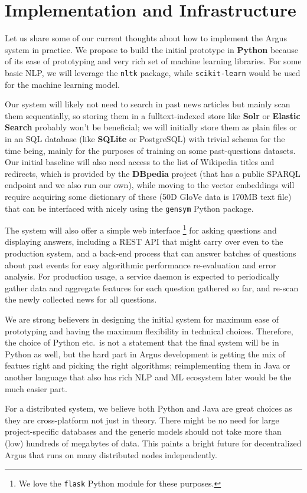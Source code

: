 \documentclass[11pt,a4paper]{article}
\begin{document}
\section{Implementation and Infrastructure}
\label{infra}

Let us share some of our current thoughts about how to implement the Argus system in practice.
We propose to build the initial prototype in \textbf{Python} because of its ease of
prototyping and very rich set of machine learning libraries.
For some basic NLP, we will leverage the \texttt{nltk} package,
while \texttt{scikit-learn} would be used
for the machine learning model.

Our system will likely not need to search in past news articles
but mainly scan them sequentially, so storing them in a fulltext-indexed
store like \textbf{Solr} or \textbf{Elastic Search} probably won't be
beneficial; we will initially store them as plain files or in an SQL
database (like \textbf{SQLite} or PostgreSQL) with trivial schema for the time being,
mainly for the purposes of training on some past-questions datasets.
Our initial baseline will also need access to the list of Wikipedia
titles and redirects, which is provided by the \textbf{DBpedia} project (that
has a public SPARQL endpoint and we also run our own), while moving
to the vector embeddings will require acquiring some dictionary of
these (50D GloVe data is 170MB text file) that can be interfaced with
nicely using the \texttt{gensym} Python package.

The system will also offer a simple web interface%
\footnote{We love the \texttt{flask} Python module for these purposes.}
for asking questions
and displaying answers, including a REST API that might carry over even
to the production system, and a back-end process that can answer batches
of questions about past events for easy algorithmic performance re-evaluation
and error analysis.
For production usage,
a service daemon is expected to periodically gather data and aggregate
features for each question gathered so far, and re-scan the newly collected
news for all questions.

We are strong believers in designing the initial system for maximum
ease of prototyping and having the maximum flexibility in technical
choices.  Therefore, the choice of Python etc.\ is not a statement
that the final system will be in Python as well, but the hard part
in Argus development is getting the mix of featues right and picking
the right algorithms; reimplementing them in Java or another language
that also has rich NLP and ML ecosystem later would be the much easier
part.

For a distributed system, we believe both Python and Java are great
choices as they are cross-platform not just in theory.  There might
be no need for large project-specific databases and the generic models
should not take more than (low) hundreds of megabytes of data.  This
paints a bright future for decentralized Argus that runs on many
distributed nodes independently.



\end{document}
